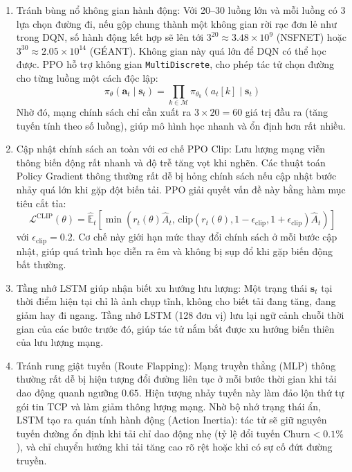 \documentclass[11pt,a4paper]{article}
\begin{document}
\begin{enumerate}[leftmargin=1.5em, itemsep=0.3ex]
    \item Tránh bùng nổ không gian hành động: Với 20--30 luồng lớn và mỗi luồng có 3 lựa chọn đường đi, nếu gộp chung thành một không gian rời rạc đơn lẻ như trong DQN, số hành động kết hợp sẽ lên tới $3^{20} \approx 3.48 \times 10^9$ (NSFNET) hoặc $3^{30} \approx 2.05 \times 10^{14}$ (GÉANT). Không gian này quá lớn để DQN có thể học được. PPO hỗ trợ không gian \texttt{MultiDiscrete}, cho phép tác tử chọn đường cho từng luồng một cách độc lập:
    \begin{equation}
        \pi_\theta(\mathbf{a}_t \mid \mathbf{s}_t) = \prod_{k \in \mathcal{M}} \pi_{\theta_k}(a_t[k] \mid \mathbf{s}_t)
    \end{equation}
    Nhờ đó, mạng chính sách chỉ cần xuất ra $3 \times 20 = 60$ giá trị đầu ra (tăng tuyến tính theo số luồng), giúp mô hình học nhanh và ổn định hơn rất nhiều.
    
    \item Cập nhật chính sách an toàn với cơ chế PPO Clip: Lưu lượng mạng viễn thông biến động rất nhanh và độ trễ tăng vọt khi nghẽn. Các thuật toán Policy Gradient thông thường rất dễ bị hỏng chính sách nếu cập nhật bước nhảy quá lớn khi gặp đột biến tải. PPO giải quyết vấn đề này bằng hàm mục tiêu cắt tỉa:
    \begin{equation}
        \mathcal{L}^{\text{CLIP}}(\theta) = \hat{\mathbb{E}}_t \left[ \min\left( r_t(\theta)\hat{A}_t, \, \text{clip}(r_t(\theta), 1-\epsilon_{\text{clip}}, 1+\epsilon_{\text{clip}})\hat{A}_t \right) \right]
    \end{equation}
    với $\epsilon_{\text{clip}} = 0.2$. Cơ chế này giới hạn mức thay đổi chính sách ở mỗi bước cập nhật, giúp quá trình học diễn ra êm và không bị sụp đổ khi gặp biến động bất thường.
    
    \item Tầng nhớ LSTM giúp nhận biết xu hướng lưu lượng: Một trạng thái $\mathbf{s}_t$ tại thời điểm hiện tại chỉ là ảnh chụp tĩnh, không cho biết tải đang tăng, đang giảm hay đi ngang. Tầng nhớ LSTM (128 đơn vị) lưu lại ngữ cảnh chuỗi thời gian của các bước trước đó, giúp tác tử nắm bắt được xu hướng biến thiên của lưu lượng mạng.
    
    \item Tránh rung giật tuyến (Route Flapping): Mạng truyền thẳng (MLP) thông thường rất dễ bị hiện tượng đổi đường liên tục ở mỗi bước thời gian khi tải dao động quanh ngưỡng $0.65$. Hiện tượng nhảy tuyến này làm đảo lộn thứ tự gói tin TCP và làm giảm thông lượng mạng. Nhờ bộ nhớ trạng thái ẩn, LSTM tạo ra quán tính hành động (Action Inertia): tác tử sẽ giữ nguyên tuyến đường ổn định khi tải chỉ dao động nhẹ (tỷ lệ đổi tuyến $\text{Churn} < 0.1\%$), và chỉ chuyển hướng khi tải tăng cao rõ rệt hoặc khi có sự cố đứt đường truyền.
\end{enumerate}
\end{document}
